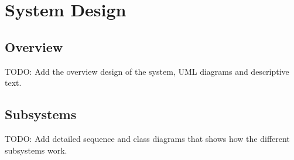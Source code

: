 \chapter{System Design}

\section{Overview}
TODO: Add the overview design of the system, UML diagrams and descriptive text.

\section{Subsystems}
TODO: Add detailed sequence and class diagrams that shows how the different
subsystems work.
